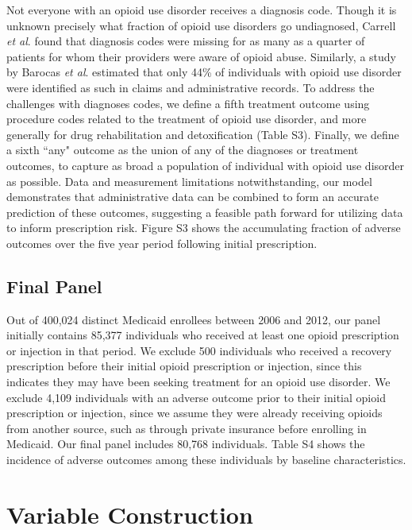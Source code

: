 \documentclass[10pt, letter]{article}
\begin{document}
Not everyone with an opioid use disorder receives a diagnosis code. Though it is unknown precisely what fraction of opioid use disorders go undiagnosed, Carrell {\em et al}. found that diagnosis codes were missing for as many as a quarter of patients for whom their providers were aware of opioid abuse. Similarly, a study by Barocas {\em et al}. estimated that only 44\% of individuals with opioid use disorder were identified as such in claims and administrative records. To address the challenges with diagnoses codes, we define a fifth treatment outcome using procedure codes related to the treatment of opioid use disorder, and more generally for drug rehabilitation and detoxification (Table S3). Finally, we define a sixth ``any" outcome as the union of any of the diagnoses or treatment outcomes, to capture as broad a population of individual with opioid use disorder as possible. Data and measurement limitations notwithstanding, our model demonstrates that administrative data can be combined to form an accurate prediction of these outcomes, suggesting a feasible path forward for utilizing data to inform prescription risk. Figure S3 shows the accumulating fraction of adverse outcomes over the five year period following initial prescription.

\subsection{Final Panel}

Out of 400,024 distinct Medicaid enrollees between 2006 and 2012, our panel initially contains 85,377 individuals who received at least one opioid prescription or injection in that period. We exclude 500 individuals who received a recovery prescription before their initial opioid prescription or injection, since this indicates they may have been seeking treatment for an opioid use disorder. We exclude 4,109 individuals with an adverse outcome prior to their initial opioid prescription or injection, since we assume they were already receiving opioids from another source, such as through private insurance before enrolling in Medicaid. Our final panel includes 80,768 individuals. Table S4 shows the incidence of adverse outcomes among these individuals by baseline characteristics.

\section{Variable Construction}
\end{document}
